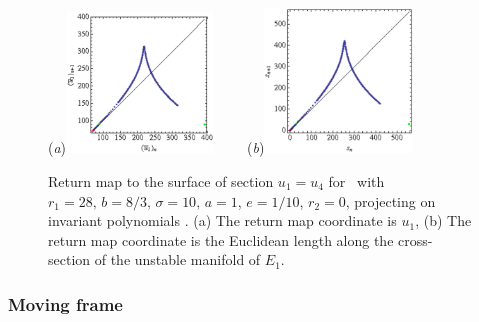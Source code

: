 \begin{figure}[t]
\begin{center}
  (\textit{a})\includegraphics[width=0.35\textwidth]{../figs/CLEipRMu1.eps}
 ~~~~(\textit{b})\includegraphics[width=0.35\textwidth]{../figs/CLEipRM.eps}
\end{center}
\caption[\Poincare return map for Complex Lorenz equations, using invariant polynomials]{Return map to the \Poincare
surface of section $u_1=u_4$ for \CLe\ with $r_1=28,\, b=8/3,\, \sigma=10,\, a=1$, $e=1/10$, $r_2=0$,
projecting on invariant polynomials . (a) The return map coordinate is
$u_1$, (b) The return map coordinate is the Euclidean
length along the \Poincare cross-section of the unstable manifold of $E_1$.
    }
\label{fig:CLEipRM}
\end{figure}

\subsubsection{Moving frame}


